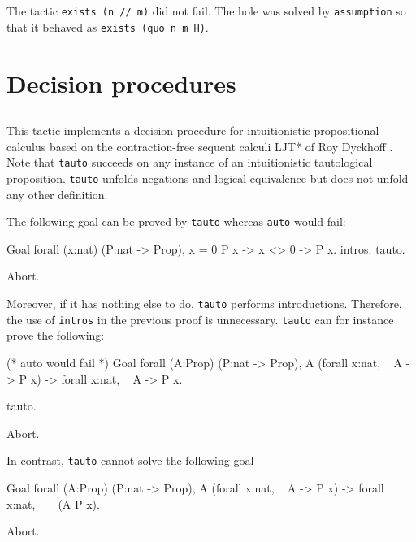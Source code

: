 The tactic {\tt exists (n // m)} did not fail. The hole was solved by
{\tt assumption} so that it behaved as {\tt exists (quo n m H)}.

\section{Decision procedures}

\subsection{}
\label{tauto}

This tactic implements a decision procedure for intuitionistic propositional
calculus based on the contraction-free sequent calculi LJT* of Roy Dyckhoff
\cite{Dyc92}. Note that {\tt tauto} succeeds on any instance of an
intuitionistic tautological proposition. {\tt tauto} unfolds negations
and logical equivalence but does not unfold any other definition.

The following goal can be proved by {\tt tauto} whereas {\tt auto}
would fail:

\begin{coq_example}
Goal forall (x:nat) (P:nat -> Prop), x = 0 \/ P x -> x <> 0 -> P x.
  intros.
  tauto.
\end{coq_example}
\begin{coq_eval}
Abort.
\end{coq_eval}

Moreover, if it has nothing else to do, {\tt tauto} performs
introductions. Therefore, the use of {\tt intros} in the previous
proof is unnecessary. {\tt tauto} can for instance prove the
following:
\begin{coq_example}
(* auto would fail *)
Goal forall (A:Prop) (P:nat -> Prop),
    A \/ (forall x:nat, ~ A -> P x) -> forall x:nat, ~ A -> P x.

  tauto.
\end{coq_example}
\begin{coq_eval}
Abort.
\end{coq_eval}

\Rem In contrast, {\tt tauto} cannot solve the following goal

\begin{coq_example*}
Goal forall (A:Prop) (P:nat -> Prop),
    A \/ (forall x:nat, ~ A -> P x) -> forall x:nat, ~ ~ (A \/ P x).
\end{coq_example*}
\begin{coq_eval}
Abort.
\end{coq_eval}

